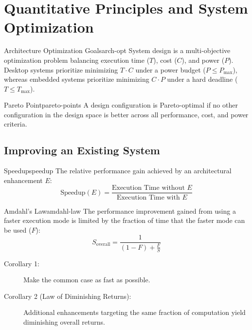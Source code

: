 \section{Quantitative Principles and System Optimization}
\begin{concept}{Architecture Optimization Goals}{arch-opt}
    System design is a multi-objective optimization problem balancing execution time (\(T\)), cost (\(C\)), and power (\(P\)). Desktop systems prioritize minimizing \(T \cdot C\) under a power budget (\(P \le P_{\text{max}}\)), whereas embedded systems prioritize minimizing \(C \cdot P\) under a hard deadline (\(T \le T_{\text{max}}\)).
\end{concept}

\begin{definition}{Pareto Point}{pareto-points}
    A design configuration is Pareto-optimal if no other configuration in the design space is better across all performance, cost, and power criteria.
\end{definition}

\subsection{Improving an Existing System}
\begin{definition}{Speedup}{speedup}
    The relative performance gain achieved by an architectural enhancement \(E\):
    \[
        \text{Speedup}(E) = \frac{\text{Execution Time without } E}{\text{Execution Time with } E}
    \]
\end{definition}

\begin{theorem}{Amdahl's Law}{amdahl-law}
    The performance improvement gained from using a faster execution mode is limited by the fraction of time that the faster mode can be used (\(F\)):
    \[
        S_{\text{overall}} = \frac{1}{(1 - F) + \frac{F}{S}}
    \]
    \begin{description}
        \item[Corollary 1:] Make the common case as fast as possible.
        \item[Corollary 2 (Law of Diminishing Returns):] Additional enhancements targeting the same fraction of computation yield diminishing overall returns.
    \end{description}
\end{theorem}

